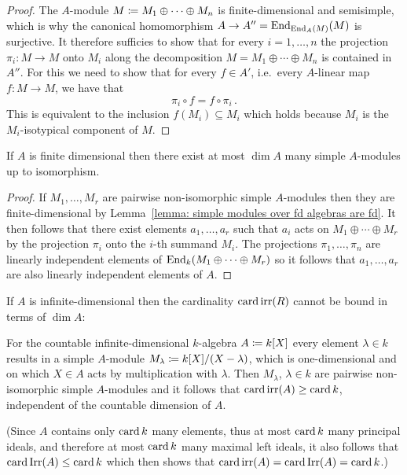 \begin{proof}
  The $A$-module $M \coloneqq M_1 \oplus \dotsb \oplus M_n$ is finite-dimensional and semisimple, which is why the canonical homomorphism $A \to A'' = \operatorname{End}_{\operatorname{End}_A(M)}(M)$ is surjective.
  It therefore sufficies to show that for every $i = 1, \dotsc, n$ the projection $\pi_i \colon M \to M$ onto $M_i$ along the decomposition $M = M_1 \oplus \dotsb \oplus M_n$ is contained in $A''$.
  For this we need to show that for every $f \in A'$, i.e.\ every $A$-linear map $f \colon M \to M$, we have that
  \[
      \pi_i \circ f
    = f \circ \pi_i \,.
  \]
  This is equivalent to the inclusion $f(M_i) \subseteq M_i$ which holds because $M_i$ is the $M_i$-isotypical component of $M$.
\end{proof}


\begin{corollary}
  If $A$ is finite dimensional then there exist at most $\dim A$ many simple $A$-modules up to isomorphism.
\end{corollary}


\begin{proof}
  If $M_1, \dotsc, M_r$ are pairwise non-isomorphic simple $A$-modules then they are finite-dimensional by Lemma~\ref{lemma: simple modules over fd algebras are fd}.
  It then follows that there exist elements $a_1, \dotsc, a_r$ such that $a_i$ acts on $M_1 \oplus \dotsb \oplus M_r$ by the projection $\pi_i$ onto the $i$-th summand $M_i$.
  The projections $\pi_1, \dotsc, \pi_n$ are linearly independent elements of $\operatorname{End}_k(M_1 \oplus \dotsb \oplus M_r)$ so it follows that $a_1, \dotsc, a_r$ are also linearly independent elements of $A$.
\end{proof}


\begin{remark}
  If $A$ is infinite-dimensional then the cardinality $\operatorname{card} \operatorname{irr}(R)$ cannot be bound in terms of $\dim A$:
  
  For the countable infinite-dimensional $k$-algebra $A \coloneqq k[X]$ every element $\lambda \in k$ results in a simple $A$-module $M_\lambda \coloneqq k[X]/(X - \lambda)$, which is one-dimensional and on which $X \in A$ acts by multiplication with $\lambda$.
  Then $M_\lambda$, $\lambda \in k$ are pairwise non-isomorphic simple $A$-modules and it follows that $\operatorname{card} \operatorname{irr}(A) \geq \operatorname{card} k$, independent of the countable dimension of $A$.
  
  (Since $A$ contains only $\operatorname{card} k$ many elements, thus at most $\operatorname{card} k$ many principal ideals, and therefore at most $\operatorname{card} k$ many maximal left ideals, it also follows that $\operatorname{card} \operatorname{Irr}(A) \leq \operatorname{card} k$ which then shows that $\operatorname{card} \operatorname{irr}(A) = \operatorname{card} \operatorname{Irr}(A) = \operatorname{card} k$.)
\end{remark}


